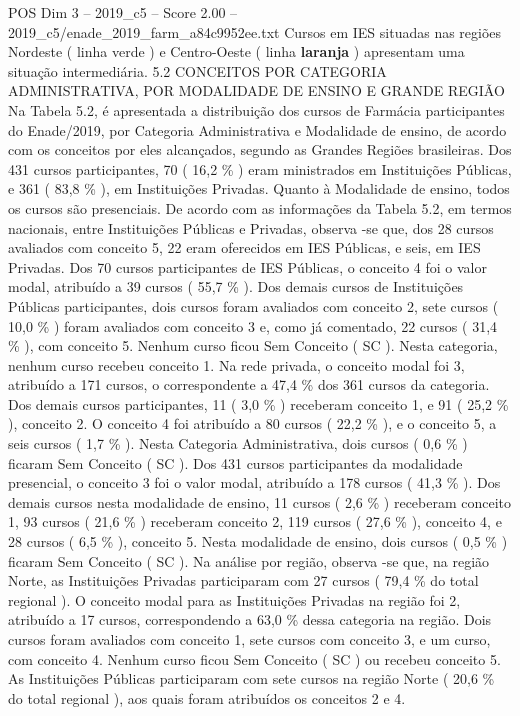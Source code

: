 \begin{textsample}{POS Dim 3 – 2019\_c5 – Score 2.00 – 2019\_c5/enade\_2019\_farm\_a84c9952ee.txt}
Cursos em IES situadas nas regiões Nordeste ( linha verde ) e Centro-Oeste ( linha \textbf{laranja} ) apresentam uma situação intermediária. 5.2 CONCEITOS POR CATEGORIA ADMINISTRATIVA, POR MODALIDADE DE ENSINO E GRANDE REGIÃO Na Tabela 5.2, é apresentada a distribuição dos cursos de Farmácia participantes do Enade/2019, por Categoria Administrativa e Modalidade de ensino, de acordo com os conceitos por eles alcançados, segundo as Grandes Regiões brasileiras.
Dos 431 cursos participantes, 70 ( 16,2 \% ) eram ministrados em Instituições Públicas, e 361 ( 83,8 \% ), em Instituições Privadas.
Quanto à Modalidade de ensino, todos os cursos são presenciais.
De acordo com as informações da Tabela 5.2, em termos nacionais, entre Instituições Públicas e Privadas, observa -se que, dos 28 cursos avaliados com conceito 5, 22 eram oferecidos em IES Públicas, e seis, em IES Privadas.
Dos 70 cursos participantes de IES Públicas, o conceito 4 foi o valor modal, atribuído a 39 cursos ( 55,7 \% ).
Dos demais cursos de Instituições Públicas participantes, dois cursos foram avaliados com conceito 2, sete cursos ( 10,0 \% ) foram avaliados com conceito 3 e, como já comentado, 22 cursos ( 31,4 \% ), com conceito 5.
Nenhum curso ficou Sem Conceito ( SC ).
Nesta categoria, nenhum curso recebeu conceito 1.
Na rede privada, o conceito modal foi 3, atribuído a 171 cursos, o correspondente a 47,4 \% dos 361 cursos da categoria.
Dos demais cursos participantes, 11 ( 3,0 \% ) receberam conceito 1, e 91 ( 25,2 \% ), conceito 2.
O conceito 4 foi atribuído a 80 cursos ( 22,2 \% ), e o conceito 5, a seis cursos ( 1,7 \% ).
Nesta Categoria Administrativa, dois cursos ( 0,6 \% ) ficaram Sem Conceito ( SC ).
Dos 431 cursos participantes da modalidade presencial, o conceito 3 foi o valor modal, atribuído a 178 cursos ( 41,3 \% ).
Dos demais cursos nesta modalidade de ensino, 11 cursos ( 2,6 \% ) receberam conceito 1, 93 cursos ( 21,6 \% ) receberam conceito 2, 119 cursos ( 27,6 \% ), conceito 4, e 28 cursos ( 6,5 \% ), conceito 5.
Nesta modalidade de ensino, dois cursos ( 0,5 \% ) ficaram Sem Conceito ( SC ).
Na análise por região, observa -se que, na região Norte, as Instituições Privadas participaram com 27 cursos ( 79,4 \% do total regional ).
O conceito modal para as Instituições Privadas na região foi 2, atribuído a 17 cursos, correspondendo a 63,0 \% dessa categoria na região.
Dois cursos foram avaliados com conceito 1, sete cursos com conceito 3, e um curso, com conceito 4.
Nenhum curso ficou Sem Conceito ( SC ) ou recebeu conceito 5.
As Instituições Públicas participaram com sete cursos na região Norte ( 20,6 \% do total regional ), aos quais foram atribuídos os conceitos 2 e 4.

\end{textsample}
